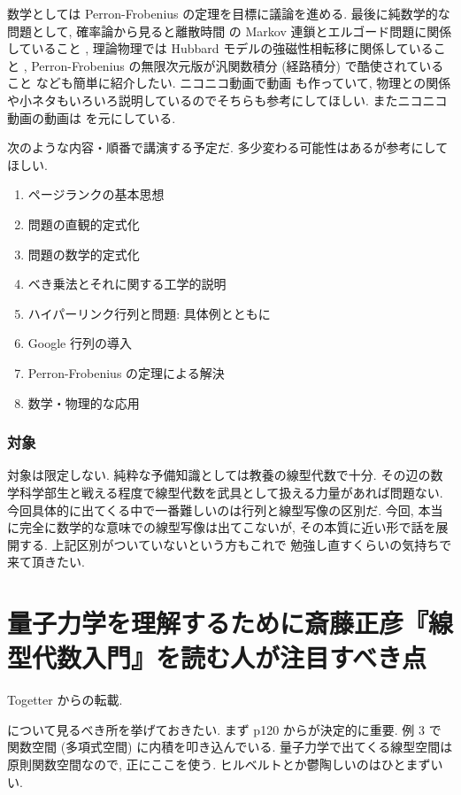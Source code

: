 \documentclass[openany, a4paper, oneside]{jsbook}
\begin{document}
数学としては Perron-Frobenius の定理を目標に議論を進める.
最後に純数学的な問題として,
確率論から見ると離散時間 の Markov 連鎖とエルゴード問題に関係していること \cite[7 節]{TadahisaFunaki1},
理論物理では Hubbard モデルの強磁性相転移に関係していること \cite{HalTasaki5},
Perron-Frobenius の無限次元版が汎関数積分 (経路積分) で酷使されていること \cite{LorincziHiroshimaBetz1} なども簡単に紹介したい.
ニコニコ動画で動画 \cite{phasetr1} も作っていて,
物理との関係や小ネタもいろいろ説明しているのでそちらも参考にしてほしい.
またニコニコ動画の動画は \cite{DavidAustin1} を元にしている.

次のような内容・順番で講演する予定だ.
多少変わる可能性はあるが参考にしてほしい.
\begin{enumerate}
\item ページランクの基本思想
\item 問題の直観的定式化
\item 問題の数学的定式化
\item ベき乗法とそれに関する工学的説明
\item ハイパーリンク行列と問題: 具体例とともに
\item Google 行列の導入
\item Perron-Frobenius の定理による解決
\item 数学・物理的な応用
\end{enumerate}


\subsection{対象}

対象は限定しない.
純粋な予備知識としては教養の線型代数で十分.
その辺の数学科学部生と戦える程度で線型代数を武具として扱える力量があれば問題ない.
今回具体的に出てくる中で一番難しいのは行列と線型写像の区別だ.
今回, 本当に完全に数学的な意味での線型写像は出てこないが,
その本質に近い形で話を展開する.
上記区別がついていないという方もこれで 勉強し直すくらいの気持ちで来て頂きたい.
\chapter{量子力学を理解するために斎藤正彦『線型代数入門』\cite{MasahikoSaitoh1}を読む人が注目すべき点}

Togetter からの転載.

\cite{MasahikoSaitoh1} について見るべき所を挙げておきたい.
まず p120 からが決定的に重要.
例 3 で関数空間 (多項式空間) に内積を叩き込んでいる.
量子力学で出てくる線型空間は原則関数空間なので, 正にここを使う.
ヒルベルトとか鬱陶しいのはひとまずいい.
\end{document}
